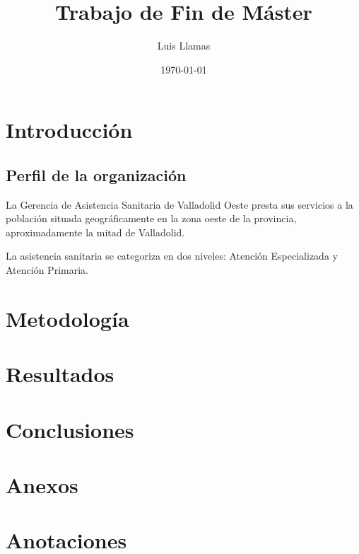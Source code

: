 \documentclass[12pt, a4paper]{book}
\begin{document}
\frontmatter
\title{Trabajo de Fin de Máster}
\author{Luis Llamas}
\date{\today}
\maketitle

\tableofcontents

\mainmatter
\chapter{Introducción}

\section{Perfil de la organización}
La Gerencia de Asistencia Sanitaria de Valladolid Oeste presta sus servicios a la población situada geográficamente en la zona oeste de la provincia, aproximadamente la mitad de Valladolid.

La asistencia sanitaria se categoriza en dos niveles: Atención Especializada y Atención Primaria. 

\chapter{Metodología}
\chapter{Resultados}
\chapter{Conclusiones}

\lipsum[1-20]

\appendix
\chapter{Anexos}

\backmatter
\chapter{Anotaciones}
\end{document}
